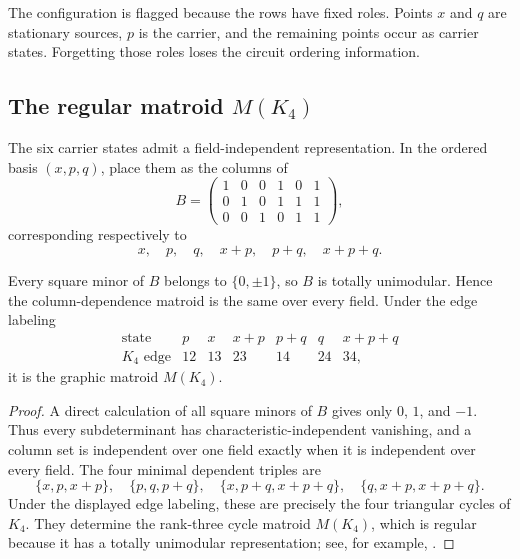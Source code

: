 The configuration is flagged because the rows have fixed roles.  Points $x$ and $q$ are stationary sources, $p$ is the carrier, and the remaining points occur as carrier states.  Forgetting those roles loses the circuit ordering information.

\subsection{The regular matroid \texorpdfstring{$M(K_4)$}{M(K4)}}

The six carrier states admit a field-independent representation.  In the ordered basis $(x,p,q)$, place them as the columns of
\begin{equation}\label{eq:k4-matrix}
B=
\begin{pmatrix}
1&0&0&1&0&1\\
0&1&0&1&1&1\\
0&0&1&0&1&1
\end{pmatrix},
\end{equation}
corresponding respectively to
\[
x,
\quad p,
\quad q,
\quad x+p,
\quad p+q,
\quad x+p+q.
\]

\begin{proposition}\label{prop:regular-matroid}
Every square minor of $B$ belongs to $\{0,\pm1\}$, so $B$ is totally unimodular.  Hence the column-dependence matroid is the same over every field.  Under the edge labeling
\[
\begin{array}{c|cccccc}
\text{state}&p&x&x+p&p+q&q&x+p+q\\
\hline
K_4\text{ edge}&12&13&23&14&24&34,
\end{array}
\]
it is the graphic matroid $M(K_4)$.
\end{proposition}

\begin{proof}
A direct calculation of all square minors of $B$ gives only $0$, $1$, and $-1$.  Thus every subdeterminant has characteristic-independent vanishing, and a column set is independent over one field exactly when it is independent over every field.  The four minimal dependent triples are
\[
\{x,p,x+p\},
\quad
\{p,q,p+q\},
\quad
\{x,p+q,x+p+q\},
\quad
\{q,x+p,x+p+q\}.
\]
Under the displayed edge labeling, these are precisely the four triangular cycles of $K_4$.  They determine the rank-three cycle matroid $M(K_4)$, which is regular because it has a totally unimodular representation; see, for example, \cite{Oxley2011}.
\end{proof}

